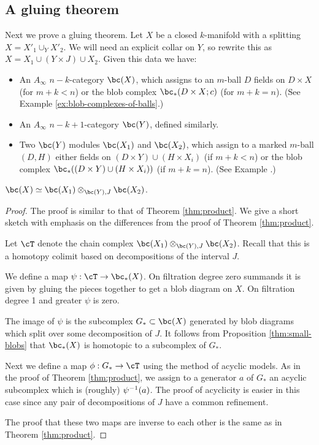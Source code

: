 \subsection{A gluing theorem}
\label{sec:gluing}

Next we prove a gluing theorem.
Let $X$ be a closed $k$-manifold with a splitting $X = X'_1\cup_Y X'_2$.
We will need an explicit collar on $Y$, so rewrite this as
$X = X_1\cup (Y\times J) \cup X_2$.
Given this data we have:
\begin{itemize}
\item An $A_\infty$ $n{-}k$-category $\bc(X)$, which assigns to an $m$-ball
$D$ fields on $D\times X$ (for $m+k < n$) or the blob complex $\bc_*(D\times X; c)$
(for $m+k = n$).
(See Example \ref{ex:blob-complexes-of-balls}.)
\item An $A_\infty$ $n{-}k{+}1$-category $\bc(Y)$, defined similarly.
\item Two $\bc(Y)$ modules $\bc(X_1)$ and $\bc(X_2)$, which assign to a marked
$m$-ball $(D, H)$ either fields on $(D\times Y) \cup (H\times X_i)$ (if $m+k < n$)
or the blob complex $\bc_*((D\times Y) \cup (H\times X_i))$ (if $m+k = n$).
(See Example .)
\end{itemize}

\begin{thm}
\label{thm:gluing}
$\bc(X) \simeq \bc(X_1) \otimes_{\bc(Y), J} \bc(X_2)$.
\end{thm}

\begin{proof}
The proof is similar to that of Theorem \ref{thm:product}.
We give a short sketch with emphasis on the differences from 
the proof of Theorem \ref{thm:product}.

Let $\cT$ denote the chain complex $\bc(X_1) \otimes_{\bc(Y), J} \bc(X_2)$.
Recall that this is a homotopy colimit based on decompositions of the interval $J$.

We define a map $\psi:\cT\to \bc_*(X)$.
On filtration degree zero summands it is given
by gluing the pieces together to get a blob diagram on $X$.
On filtration degree 1 and greater $\psi$ is zero.

The image of $\psi$ is the subcomplex $G_*\sub \bc(X)$ generated by blob diagrams which split
over some decomposition of $J$.
It follows from Proposition \ref{thm:small-blobs} that $\bc_*(X)$ is homotopic to 
a subcomplex of $G_*$. 

Next we define a map $\phi:G_*\to \cT$ using the method of acyclic models.
As in the proof of Theorem \ref{thm:product}, we assign to a generator $a$ of $G_*$
an acyclic subcomplex which is (roughly) $\psi^{-1}(a)$.
The proof of acyclicity is easier in this case since any pair of decompositions of $J$ have
a common refinement.

The proof that these two maps are inverse to each other is the same as in
Theorem \ref{thm:product}.
\end{proof}

